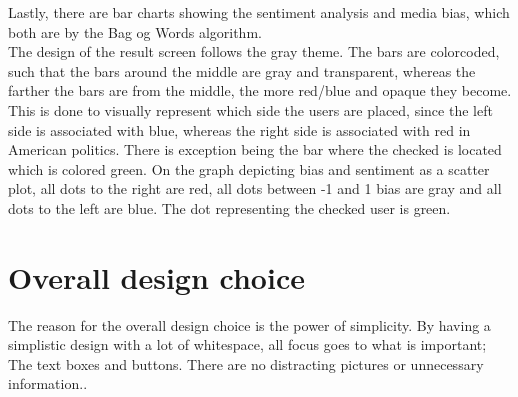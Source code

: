 Lastly, there are bar charts showing the sentiment analysis and media bias,
which both are by the Bag og Words algorithm. \\

The design of the result screen follows the gray theme. The bars are colorcoded,
such that the bars around the middle are gray and transparent, whereas the
farther the bars are from the middle, the more red/blue and opaque they become.
This is done to visually represent which side the users are placed, since the
left side is associated with blue, whereas the right side is associated with red
in American politics. There is exception being the bar where the checked is
located which is colored green. On the graph depicting bias and sentiment as a
scatter plot, all dots to the right are red, all dots between -1 and 1 bias are
gray and all dots to the left are blue. The dot representing the checked user is
green.

\section{Overall design choice}
The reason for the overall design choice is the power of simplicity. By having a
simplistic design with a lot of whitespace, all focus goes to what is
important; The text boxes and buttons. There are no distracting
pictures or unnecessary information.\citep[p. 26 \& 32]{WebUI}.\\